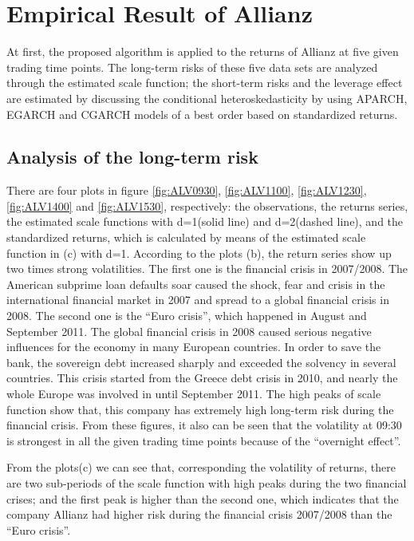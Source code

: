 \section{Empirical Result of Allianz}

At first, the proposed algorithm is applied to the returns of Allianz at five given trading time points. The long-term risks of these five data sets are analyzed through the estimated scale function; the short-term risks and the leverage effect are estimated by discussing the conditional heteroskedasticity by using APARCH, EGARCH and CGARCH models of a best order based on standardized returns. 

\subsection{Analysis of the long-term risk}


There are four plots in figure \ref{fig:ALV0930}, \ref{fig:ALV1100}, \ref{fig:ALV1230}, \ref{fig:ALV1400} and \ref{fig:ALV1530}, respectively: the observations, the returns series, the estimated scale functions with d=1(solid line) and d=2(dashed line), and the standardized returns, which is calculated by means of the estimated scale function in (c) with d=1. 
According to the plots (b), the return series show up two times strong volatilities. The first one is the financial crisis in 2007/2008. The American subprime loan defaults soar caused the shock, fear and crisis in the international financial market in 2007 and spread to a global financial crisis in 2008. The second one is the ``Euro crisis'', which happened in August and September 2011. The global financial crisis in 2008 caused serious negative influences for the economy in many European countries. In order to save the bank, the sovereign debt increased sharply and exceeded the solvency in several countries. This crisis started from the Greece debt crisis in 2010, and nearly the whole Europe was involved in until September 2011. The high peaks of scale function show that, this company has extremely high long-term risk during the financial crisis. From these figures, it also can be seen that the volatility at 09:30 is strongest in all the given trading time points because of the ``overnight effect''. 

From the plots(c) we can see that, corresponding the volatility of returns, there are two sub-periods of the scale function with high peaks during the two financial crises; and the first peak is higher than the second one, which indicates that the company Allianz had higher risk during the financial crisis 2007/2008 than the ``Euro crisis''.

